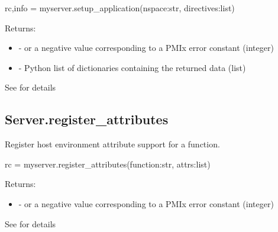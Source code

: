 \pyspecificstart
\begin{codepar}
rc,info = myserver.setup_application(nspace:str, directives:list)
\end{codepar}
\pyspecificend


\begin{arglist}
\end{arglist}

Returns:

\begin{itemize}
    \item {} -  or a negative value corresponding to a PMIx error constant (integer)
    \item {} - Python list of  dictionaries containing the returned data (list)
\end{itemize}


See  for details


\subsection{Server.register_attributes}

\summary
Register host environment attribute support for a function.

\format

\pyspecificstart
\begin{codepar}
rc = myserver.register_attributes(function:str, attrs:list)
\end{codepar}
\pyspecificend


\begin{arglist}
\end{arglist}

Returns:

\begin{itemize}
    \item {} -  or a negative value corresponding to a PMIx error constant (integer)
\end{itemize}


See  for details


